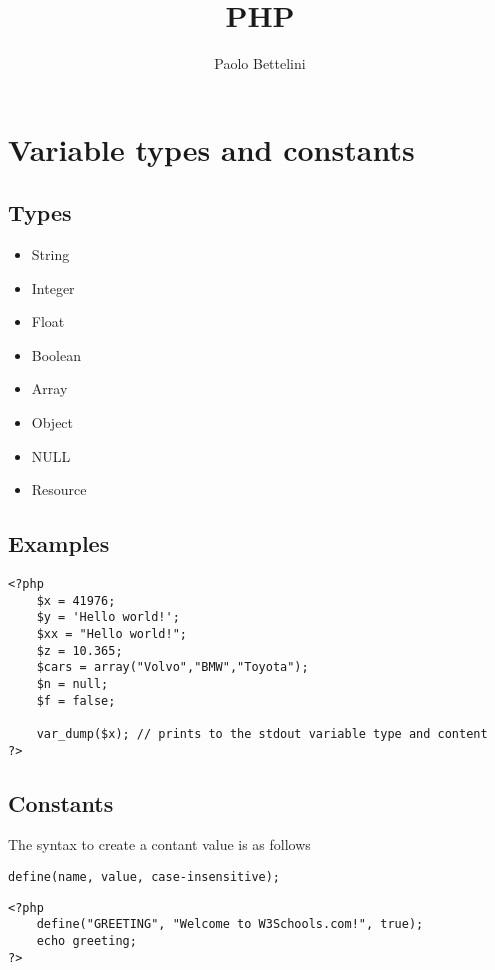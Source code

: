 \documentclass{article}
\title{PHP}
\author{Paolo Bettelini}
\date{}
\begin{document}
\maketitle
\tableofcontents
\pagebreak

\section{Variable types and constants}

\subsection{Types}

\begin{itemize}
    \item String
    \item Integer
    \item Float
    \item Boolean
    \item Array
    \item Object
    \item NULL
    \item Resource
\end{itemize}

\subsection{Examples}

\begin{lstlisting}
<?php
    $x = 41976;
    $y = 'Hello world!';
    $xx = "Hello world!";
    $z = 10.365;
    $cars = array("Volvo","BMW","Toyota");
    $n = null;
    $f = false;
    
    var_dump($x); // prints to the stdout variable type and content
?>
\end{lstlisting}

\subsection{Constants}

The syntax to create a contant value is as follows

\begin{lstlisting}
define(name, value, case-insensitive);
\end{lstlisting}

\begin{lstlisting}
<?php
    define("GREETING", "Welcome to W3Schools.com!", true);
    echo greeting;
?>
\end{lstlisting}
\end{document}
